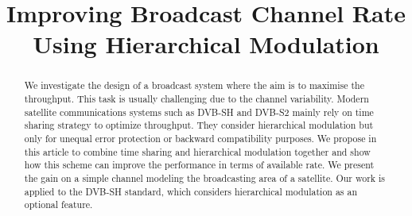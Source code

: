 \documentclass[conference, letterpaper]{IEEEtran}
\begin{document}
\title{Improving Broadcast Channel Rate Using Hierarchical Modulation}




\author{
}



\IEEEoverridecommandlockouts












\maketitle


\begin{abstract}


We investigate the design of a broadcast system where the aim is to maximise the throughput. This task is usually challenging due to the channel variability. Modern satellite communications systems such as DVB-SH and DVB-S2 mainly rely on time sharing strategy to optimize throughput. They consider hierarchical modulation but only for unequal error protection or backward compatibility purposes. We propose in this article to combine time sharing and hierarchical modulation together and show how this scheme can improve the performance in terms of available rate. We present the gain on a simple channel modeling the broadcasting area of a satellite. Our work is applied to the DVB-SH standard, which considers hierarchical modulation as an optional feature.
\end{abstract}





\IEEEpeerreviewmaketitle
\end{document}
